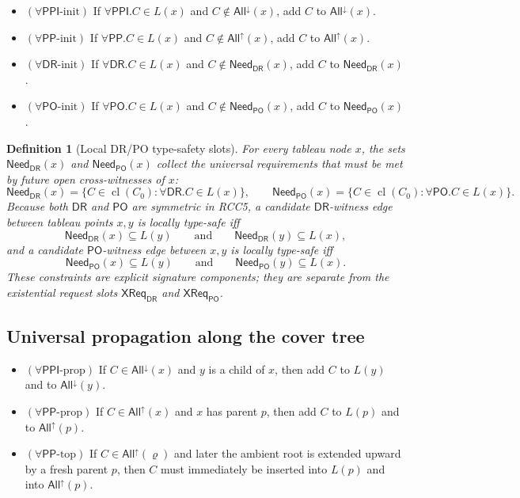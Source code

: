 \documentclass[11pt]{article}
\newtheorem{definition}{Definition}[section]
\theoremstyle{remark}
\newcommand{\DR}{\mathsf{DR}}
\newcommand{\PO}{\mathsf{PO}}
\newcommand{\PP}{\mathsf{PP}}
\newcommand{\PPI}{\mathsf{PPI}}
\newcommand{\cl}{\operatorname{cl}}
\newcommand{\AllUp}{\mathsf{All}^{\uparrow}}
\newcommand{\AllDown}{\mathsf{All}^{\downarrow}}
\newcommand{\CrossDR}{\mathsf{XReq}_{\DR}}
\newcommand{\CrossPO}{\mathsf{XReq}_{\PO}}
\newcommand{\NeedDR}{\mathsf{Need}_{\DR}}
\newcommand{\NeedPO}{\mathsf{Need}_{\PO}}
\begin{document}
\begin{itemize}
    \item $(\forall\PPI\text{-init})$ If $\forall\PPI.C\in L(x)$ and $C\notin \AllDown(x)$, add $C$ to $\AllDown(x)$.
    \item $(\forall\PP\text{-init})$ If $\forall\PP.C\in L(x)$ and $C\notin \AllUp(x)$, add $C$ to $\AllUp(x)$.
    \item $(\forall\DR\text{-init})$ If $\forall\DR.C\in L(x)$ and $C\notin \NeedDR(x)$, add $C$ to $\NeedDR(x)$.
    \item $(\forall\PO\text{-init})$ If $\forall\PO.C\in L(x)$ and $C\notin \NeedPO(x)$, add $C$ to $\NeedPO(x)$.
\end{itemize}

\begin{definition}[Local DR/PO type-safety slots]
For every tableau node $x$, the sets $\NeedDR(x)$ and $\NeedPO(x)$ collect the universal requirements that must be met by future open cross-witnesses of $x$:
\[
\NeedDR(x)=\{C\in\cl(C_0): \forall\DR.C\in L(x)\},
\qquad
\NeedPO(x)=\{C\in\cl(C_0): \forall\PO.C\in L(x)\}.
\]
Because both $\DR$ and $\PO$ are symmetric in RCC5, a candidate $\DR$-witness edge between tableau points $x,y$ is locally type-safe iff
\[
\NeedDR(x)\subseteq L(y)
\qquad\text{and}\qquad
\NeedDR(y)\subseteq L(x),
\]
and a candidate $\PO$-witness edge between $x,y$ is locally type-safe iff
\[
\NeedPO(x)\subseteq L(y)
\qquad\text{and}\qquad
\NeedPO(y)\subseteq L(x).
\]
These constraints are explicit signature components; they are separate from the existential request slots $\CrossDR$ and $\CrossPO$.
\end{definition}

\subsection{Universal propagation along the cover tree}

\begin{itemize}
    \item $(\forall\PPI\text{-prop})$ If $C\in \AllDown(x)$ and $y$ is a child of $x$, then add $C$ to $L(y)$ and to $\AllDown(y)$.
    \item $(\forall\PP\text{-prop})$ If $C\in \AllUp(x)$ and $x$ has parent $p$, then add $C$ to $L(p)$ and to $\AllUp(p)$.
    \item $(\forall\PP\text{-top})$ If $C\in \AllUp(\varrho)$ and later the ambient root is extended upward by a fresh parent $p$, then $C$ must immediately be inserted into $L(p)$ and into $\AllUp(p)$.
\end{itemize}
\end{document}
